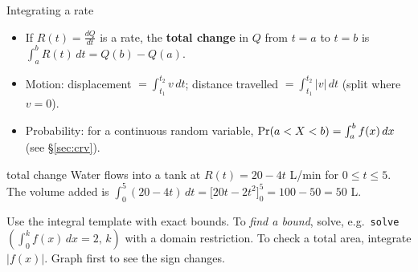 \begin{cols}
\begin{keyres}{Integrating a rate}
\begin{itemize}
  \item If $R(t)=\frac{dQ}{dt}$ is a rate, the \textbf{total change} in $Q$ from $t=a$ to $t=b$ is $\int_a^bR(t)\,dt=Q(b)-Q(a)$.
  \item Motion: displacement $=\int_{t_1}^{t_2}v\,dt$; distance travelled $=\int_{t_1}^{t_2}|v|\,dt$ (split where $v=0$).
  \item Probability: for a continuous random variable, $\Pr(a<X<b)=\int_a^bf(x)\,dx$ (see \S\ref{sec:crv}).
\end{itemize}
\end{keyres}
\nextcol
\begin{example}{total change}
Water flows into a tank at $R(t)=20-4t$ L/min for $0\le t\le5$. The volume added is
$\int_0^5(20-4t)\,dt=\big[20t-2t^2\big]_0^5=100-50=50$ L.
\end{example}
\begin{cas}
Use the integral template with exact bounds. To \emph{find a bound}, solve, e.g.\ \texttt{solve}$\left(\int_0^kf(x)\,dx=2,\,k\right)$ with a domain restriction. To check a total area, integrate $|f(x)|$. Graph first to see the sign changes.
\end{cas}
\end{cols}
